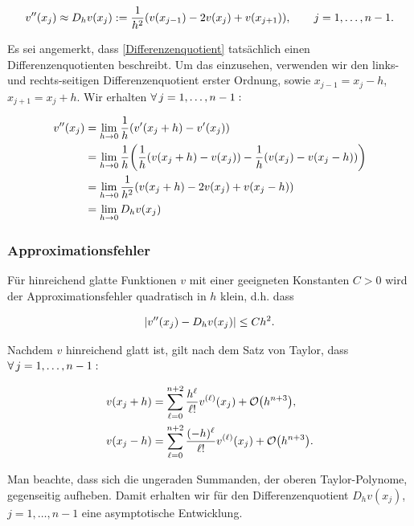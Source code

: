\begin{align} \label{Differenzenquotient}
  v^{\prime \prime}(x_j) \approx
  D_h v(x_j) :=
  \frac{1}{h^2} (v(x_{j-1}) - 2 v(x_j) + v(x_{j+1})), \qquad
  j = 1, \ldots, n-1.
\end{align}

Es sei angemerkt, dass \eqref{Differenzenquotient} tatsächlich einen Differenzenquotienten beschreibt. Um das einzusehen, verwenden wir den links- und rechts-seitigen Differenzenquotient erster Ordnung, sowie $x_{j-1} = x_j - h$, $x_{j+1} = x_j + h$. Wir erhalten $\forall \, j = 1, \ldots, n-1:$

\begin{align*}
  v^{\prime \prime}(x_j)
  & = \lim_{h \to 0}
      \frac{1}{h} {\left ( 
        v^\prime(x_j + h) - v^\prime(x_j)
       \right )} \\
  & = \lim_{h \to 0}
      \frac{1}{h} {\left ( 
        \frac{1}{h} {\left ( 
          v(x_j + h) - v(x_j)
         \right )} -
        \frac{1}{h} {\left ( 
          v(x_j) - v(x_j - h)
         \right )}
       \right )} \\
  & = \lim_{h \to 0}
      \frac{1}{h^2} {\left ( 
        v(x_j + h) - 2 v(x_j) + v(x_j - h)
       \right )} \\
  & = \lim_{h \to 0}
      D_h v(x_j)
\end{align*}

\subsubsection{Approximationsfehler}

Für hinreichend glatte Funktionen $v$ mit einer geeigneten Konstanten $C > 0$ wird der Approximationsfehler quadratisch in $h$ klein, d.h. dass

\begin{align} \label{quadratische_Konvergenz}
  {\left | v^{\prime \prime}(x_j) - D_h v(x_j) \right |} \leq C h^2.
\end{align}

Nachdem $v$ hinreichend glatt ist, gilt nach dem Satz von Taylor, dass $\forall \, j = 1, \ldots, n-1:$

\begin{align*}
  v(x_j + h) & =
  \sum_{\ell = 0}^{n+2}
  \frac{h^\ell}{\ell !}
  v^{(\ell)}(x_j) +
  \mathcal{O} {\left ( h^{n+3} \right )}, \\
  v(x_j - h) & =
  \sum_{\ell = 0}^{n+2}
  \frac{(-h)^\ell}{\ell !}
  v^{(\ell)}(x_j) +
  \mathcal{O} {\left ( h^{n+3} \right )}.
\end{align*}

Man beachte, dass sich die ungeraden Summanden, der oberen Taylor-Polynome, gegenseitig aufheben. Damit erhalten wir für den Differenzenquotient $D_h v(x_j)$, $j = 1, \ldots, n-1$ eine asymptotische Entwicklung.

